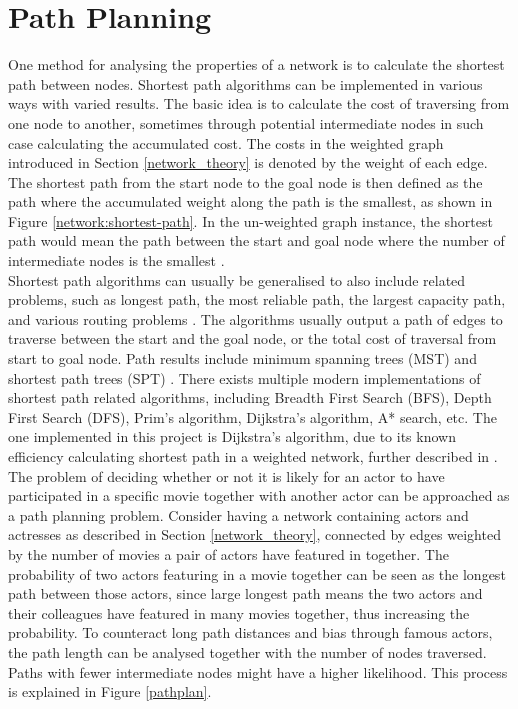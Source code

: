 \documentclass[12pt]{ieeeconf}      %
\begin{document}
\section{Path Planning}
\label{pathPlanning}
\indent One method for analysing the properties of a network is to calculate the shortest path between nodes. Shortest path algorithms can be implemented in various ways with varied results. The basic idea is to calculate the cost of traversing from one node to another, sometimes through potential intermediate nodes in such case calculating the accumulated cost. The costs in the weighted graph introduced in Section \ref{network_theory} is denoted by the weight of each edge. The shortest path from the start node to the goal node is then defined as the path where the accumulated weight along the path is the smallest, as shown in Figure \ref{network:shortest-path}. In the un-weighted graph instance, the shortest path would mean the path between the start and goal node where the number of intermediate nodes is the smallest \cite{network:shortest_path}.
\\
\indent Shortest path algorithms can usually be generalised to also include related problems, such as longest path, the most reliable path, the largest capacity path, and various routing problems \cite{network:shortest_path}. The algorithms usually output a path of edges to traverse between the start and the goal node, or the total cost of traversal from start to goal node. Path results include minimum spanning trees (MST) and shortest path trees (SPT) \cite{network:trees}. There exists multiple modern implementations of shortest path related algorithms, including Breadth First Search (BFS), Depth First Search (DFS), Prim's algorithm, Dijkstra's algorithm, A* search, etc. The one implemented in this project is Dijkstra's algorithm, due to its known efficiency calculating shortest path in a weighted network, further described in \cite{network:dijkstras}.
\\
\indent The problem of deciding whether or not it is likely for an actor to have participated in a specific movie together with another actor can be approached as a path planning problem. Consider having a network containing actors and actresses as described in Section \ref{network_theory}, connected by edges weighted by the number of movies a pair of actors have featured in together. The probability of two actors featuring in a movie together can be seen as the longest path between those actors, since large longest path means the two actors and their colleagues have featured in many movies together, thus increasing the probability. To counteract long path distances and bias through famous actors, the path length can be analysed together with the number of nodes traversed. Paths with fewer intermediate nodes might have a higher likelihood. This process is explained in Figure \ref{pathplan}.
\end{document}
